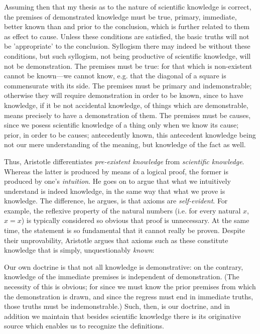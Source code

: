 \begin{displayquote}
	Assuming then that my thesis as to the nature of scientific knowledge is correct, the premises of demonstrated knowledge must be true, primary, immediate, better known than and prior to the conclusion, which is further related to them as effect to cause. Unless these conditions are satisfied, the basic truths will not be 'appropriate' to the conclusion. Syllogism there may indeed be without these conditions, but such syllogism, not being productive of scientific knowledge, will not be demonstration. The premises must be true: for that which is non-existent cannot be known---we cannot know, e.g. that the diagonal of a square is commensurate with its side. The premises must be primary and indemonstrable; otherwise they will require demonstration in order to be known, since to have knowledge, if it be not accidental knowledge, of things which are demonstrable, means precisely to have a demonstration of them. The premises must be causes, since we posess scientific knowledge of a thing only when we know its cause; prior, in order to be causes; antecedently known, this antecedent knowledge being not our mere understanding of the meaning, but knowledge of the fact as well. \\
\end{displayquote}

Thus, Aristotle differentiates \textit{pre-existent knowledge} from \textit{scientific knowledge}. Whereas the latter is produced by means of a logical proof, the former is produced by one's \textit{intuition}. He goes on to argue that what we intuitively understand is indeed knowledge, in the same way that what we prove is knowledge. The difference, he argues, is that axioms are \textit{self-evident}. For example, the reflexive property of the natural numbers (i.e. for every natural $x$, $x=x$) is typically considered so obvious that proof is unnecessary. At the same time, the statement is so fundamental that it cannot really be proven. Despite their unprovability, Aristotle argues that axioms such as these constitute knowledge that is simply, unquestionably \textit{known}: \\

\begin{displayquote}
	Our own doctrine is that not all knowledge is demonstrative: on the contrary, knowledge of the immediate premises is independent of demonstration. (The necessity of this is obvious; for since we must know the prior premises from which the demonstration is drawn, and since the regress must end in immediate truths, those truths must be indemonstrable.) Such, then, is our doctrine, and in addition we maintain that besides scientific knowledge there is its originative source which enables us to recognize the definitions. \\
\end{displayquote}

